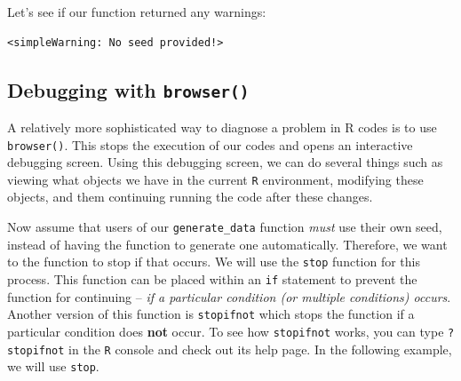 \documentclass[
]{book}
\newenvironment{Shaded}{\begin{snugshade}}{\end{snugshade}}
\newcommand{\NormalTok}[1]{#1}
\newcommand{\OperatorTok}[1]{\textcolor[rgb]{0.81,0.36,0.00}{\textbf{#1}}}
\begin{document}
Let's see if our function returned any warnings:

\begin{Shaded}
\end{Shaded}

\begin{verbatim}
<simpleWarning: No seed provided!>
\end{verbatim}

\hypertarget{debugging-with-browser}{%
\subsection{\texorpdfstring{Debugging with \texttt{browser()}}{Debugging with browser()}}\label{debugging-with-browser}}

A relatively more sophisticated way to diagnose a problem in R codes is to use \texttt{browser()}. This stops the execution of our codes and opens an interactive debugging screen. Using this debugging screen, we can do several things such as viewing what objects we have in the current \texttt{R} environment, modifying these objects, and them continuing running the code after these changes.

Now assume that users of our \texttt{generate\_data} function \emph{must} use their own seed, instead of having the function to generate one automatically. Therefore, we want to the function to stop if that occurs. We will use the \texttt{stop} function for this process. This function can be placed within an \texttt{if} statement to prevent the function for continuing -- \emph{if a particular condition (or multiple conditions) occurs}. Another version of this function is \texttt{stopifnot} which stops the function if a particular condition does \textbf{not} occur. To see how \texttt{stopifnot} works, you can type \texttt{?stopifnot} in the \texttt{R} console and check out its help page. In the following example, we will use \texttt{stop}.
\end{document}
